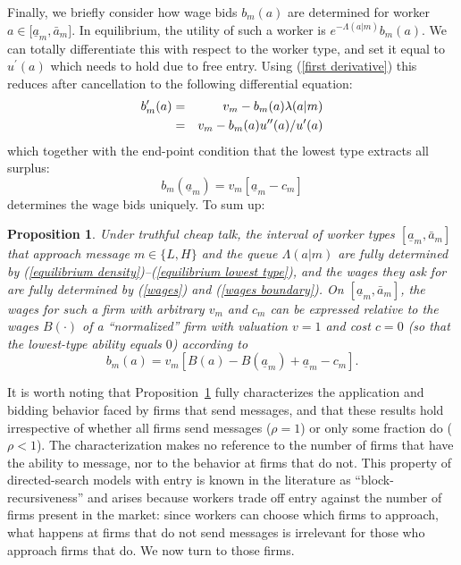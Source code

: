 \documentclass[12pt]{article}
\newtheorem{prop}{Proposition}
\begin{document}
Finally, we briefly consider how wage bids $b_{m}(a)$ are determined for
worker $a\in \lbrack \underline{a}_{m},\bar{a}_{m}]$. In equilibrium, the
utility of such a worker is $e^{-\Lambda (a|m)}b_{m}(a)$. We can totally
differentiate this with respect to the worker type, and set it equal to $%
u^{\prime }(a)$ which needs to hold due to free entry. Using (\ref{first
derivative}) this reduces after cancellation to the following differential
equation: 
\begin{eqnarray}
b_{m}^{\prime }(a) &=&v_{m}-b_{m}(a)\lambda (a|m)  \notag \\
&=&v_{m}-b_{m}(a)u^{\prime \prime }(a)/u^{\prime }(a)  \label{wages}
\end{eqnarray}%
which together with the end-point condition that the lowest type extracts all
surplus:
\begin{equation}
b_{m}(\underline{a}_{m})=v_{m}[\underline{a}_{m}-c_{m}]
\label{wages boundary}
\end{equation}%
determines the wage bids uniquely. To sum up:

\begin{prop}
\label{equilibrium-characterization}\label{workers}Under truthful cheap talk, the interval of worker types $[\underline{a}_{m},\bar{a}_{m}]$ that approach message $m\in\{L,H\}$ and the queue $\Lambda(a|m)$ are fully determined by (\ref{equilibrium density})--(\ref{equilibrium lowest type}), and the wages they ask for are fully determined by (\ref{wages}) and (\ref{wages boundary}). On $[\underline{a}_{m},\bar{a}_{m}]$, the wages for such a firm with arbitrary $v_{m}$ and $c_{m}$ can be expressed relative to the wages $B(\cdot)$ of a ``normalized'' firm with valuation $v=1$ and cost $c=0$ (so that the lowest-type ability equals $0$) according to
\begin{equation}
b_{m}(a)=v_{m}[B(a)-B(\underline{a}_{m})+\underline{a}_{m}-c_{m}].
\label{bidding1}
\end{equation}
\end{prop}

\bigskip

It is worth noting that Proposition~\ref{equilibrium-characterization} fully characterizes the application and bidding behavior faced by firms that send messages, and that these results hold irrespective of whether all firms send messages ($\rho=1$) or only some fraction do ($\rho<1$). The characterization makes no reference to the number of firms that have the ability to message, nor to the behavior at firms that do not. This property of directed-search models with entry is known in the literature as ``block-recursiveness'' and arises because workers trade off entry against the number of firms present in the market: since workers can choose which firms to approach, what happens at firms that do not send messages is irrelevant for those who approach firms that do. We now turn to those firms.
\end{document}
